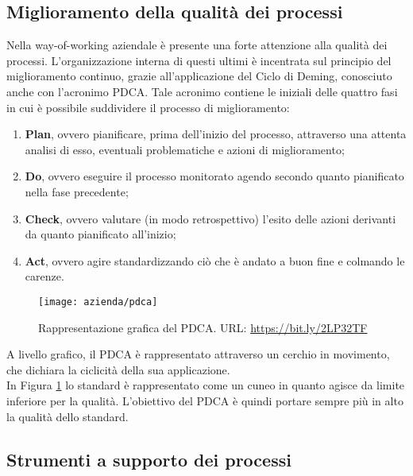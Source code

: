 \subsection{Miglioramento della qualità dei processi}
Nella way-of-working aziendale è presente una forte attenzione alla qualità dei processi. L'organizzazione interna di questi ultimi è incentrata sul principio del miglioramento continuo, grazie all'applicazione del Ciclo di Deming, conosciuto anche con l'acronimo PDCA. Tale acronimo contiene le iniziali delle quattro fasi in cui è possibile suddividere il processo di miglioramento: \begin{enumerate}
	\item \textbf{Plan}, ovvero pianificare, prima dell'inizio del processo, attraverso una attenta analisi di esso, eventuali problematiche e azioni di miglioramento;
	\item \textbf{Do}, ovvero eseguire il processo monitorato agendo secondo quanto pianificato nella fase precedente;
	\item \textbf{Check}, ovvero valutare (in modo retrospettivo) l'esito delle azioni derivanti da quanto pianificato all'inizio;
	\item \textbf{Act}, ovvero agire standardizzando ciò che è andato a buon fine e colmando le carenze.
\end{enumerate}
\begin{figure}[!h] 
	\centering 
	\texttt{[image: azienda/pdca]} 
	\caption{Rappresentazione grafica del PDCA. URL: \url{https://bit.ly/2LP32TF} }
	\label{figura:pdca}
\end{figure}
A livello grafico, il PDCA è rappresentato attraverso un cerchio in movimento, che dichiara la ciclicità della sua applicazione.\\
In Figura \ref{figura:pdca} lo standard è rappresentato come un cuneo in quanto agisce da limite inferiore per la qualità. L'obiettivo del PDCA è quindi portare sempre più in alto la qualità dello standard.

\subsection{Strumenti a supporto dei processi}
